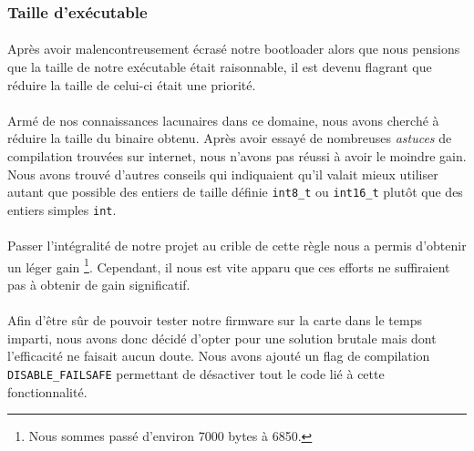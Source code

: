 \subsubsection{Taille d'exécutable}
\paragraph{}
Après avoir malencontreusement écrasé notre bootloader alors que nous pensions
que la taille de notre exécutable était raisonnable, il est devenu flagrant que
réduire la taille de celui-ci était une priorité.

\paragraph{}
Armé de nos connaissances lacunaires dans ce domaine, nous avons cherché à
réduire la taille du binaire obtenu. Après avoir essayé de nombreuses
{\em astuces} de compilation trouvées sur internet, nous n'avons pas réussi à
avoir le moindre gain. Nous avons trouvé d'autres conseils qui indiquaient qu'il
valait mieux utiliser autant que possible des entiers de taille définie
\verb!int8_t! ou \verb!int16_t! plutôt que des entiers simples \verb!int!.

\paragraph{}
Passer l'intégralité de notre projet au crible de cette règle nous a permis
d'obtenir un léger gain
          \footnote{Nous sommes passé d'environ 7000 bytes à 6850.}.
Cependant, il nous est vite apparu que ces efforts ne suffiraient pas à obtenir
de gain significatif.

\paragraph{}
Afin d'être sûr de pouvoir tester notre firmware sur la carte dans le temps
imparti, nous avons donc décidé d'opter pour une solution brutale mais dont
l'efficacité ne faisait aucun doute. Nous avons ajouté un flag de compilation
\verb!DISABLE_FAILSAFE! permettant de désactiver tout le code lié à cette
fonctionnalité.

